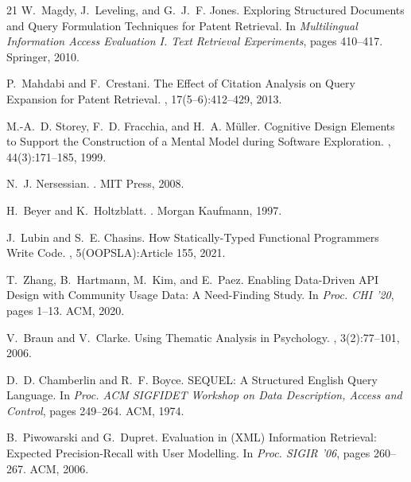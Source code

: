 \documentclass[sigconf]{acmart}
\begin{document}
\begin{thebibliography}{21}
W.~Magdy, J.~Leveling, and G.~J.~F. Jones.
\newblock Exploring Structured Documents and Query Formulation Techniques for
  Patent Retrieval.
\newblock In {\em Multilingual Information Access Evaluation I. Text Retrieval
  Experiments}, pages 410--417. Springer, 2010.

P.~Mahdabi and F.~Crestani.
\newblock The Effect of Citation Analysis on Query Expansion for Patent
  Retrieval.
, 17(5--6):412--429, 2013.

M.-A.~D. Storey, F.~D. Fracchia, and H.~A. M{\"u}ller.
\newblock Cognitive Design Elements to Support the Construction of a Mental
  Model during Software Exploration.
, 44(3):171--185, 1999.

N.~J. Nersessian.
.
\newblock MIT Press, 2008.

H.~Beyer and K.~Holtzblatt.
.
\newblock Morgan Kaufmann, 1997.

J.~Lubin and S.~E. Chasins.
\newblock How Statically-Typed Functional Programmers Write Code.
, 5(OOPSLA):Article 155, 2021.

T.~Zhang, B.~Hartmann, M.~Kim, and E.~Paez.
\newblock Enabling Data-Driven API Design with Community Usage Data:
  A Need-Finding Study.
\newblock In {\em Proc. CHI '20}, pages 1--13. ACM, 2020.

V.~Braun and V.~Clarke.
\newblock Using Thematic Analysis in Psychology.
, 3(2):77--101, 2006.

D.~D. Chamberlin and R.~F. Boyce.
\newblock SEQUEL: A Structured English Query Language.
\newblock In {\em Proc. ACM SIGFIDET Workshop on Data Description, Access and
  Control}, pages 249--264. ACM, 1974.

B.~Piwowarski and G.~Dupret.
\newblock Evaluation in (XML) Information Retrieval: Expected
  Precision-Recall with User Modelling.
\newblock In {\em Proc. SIGIR '06}, pages 260--267. ACM, 2006.

\end{thebibliography}
\end{document}
